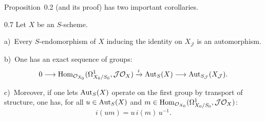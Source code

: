 Proposition~0.2 (and its proof) has two important corollaries.%
{\renewcommand{\thefootnote}{(24)}}

\begin{corollary}{0.7}
\label{III.0.7}
Let \(X\) be an \(S\)-scheme.

a)~Every \(S\)-endomorphism of \(X\) inducing the identity on \(X_{\mathcal{J}}\)
is an automorphism.

b)~One has an exact sequence of groups:
\[
0 \longrightarrow
\operatorname{Hom}_{\mathcal{O}_{X_{0}}}(\Omega^{1}_{X_{0}/S_{0}},\mathcal{J}\mathcal{O}_{X})
\xrightarrow{i}
\operatorname{Aut}_{S}(X)
\longrightarrow
\operatorname{Aut}_{S_{\mathcal{J}}}(X_{\mathcal{J}}).
\]

c)~Moreover, if one lets \(\operatorname{Aut}_{S}(X)\) operate on the first group by
transport of structure, one has, for all \(u\in\operatorname{Aut}_{S}(X)\) and
\(m\in\operatorname{Hom}_{\mathcal{O}_{X_{0}}}(\Omega^{1}_{X_{0}/S_{0}},
\mathcal{J}\mathcal{O}_{X})\):
\[
i(um)=u\,i(m)\,u^{-1}.
\]
\end{corollary}

